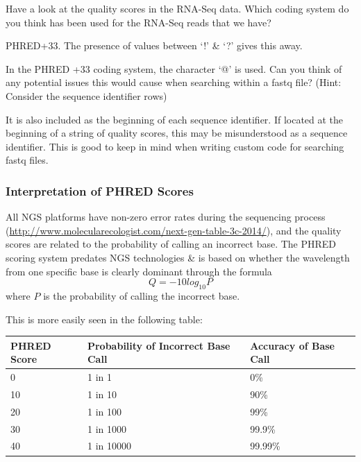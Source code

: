 \begin{questions}
Have a look at the quality scores in the RNA-Seq data.
Which coding system do you think has been used for the RNA-Seq reads that we have? \\
\begin{answer}
PHRED+33.
The presence of values between `!' \& `?' gives this away.\\
\end{answer}
In the PHRED +33 coding system, the character `@' is used.
Can you think of any potential issues this would cause when searching within a fastq file?
(Hint: Consider the sequence identifier rows)\\
\begin{answer}
It is also included as the beginning of each sequence identifier.
If located at the beginning of a string of quality scores, this may be misunderstood as a sequence identifier.
This is good to keep in mind when writing custom code for searching fastq files.
\end{answer}
\end{questions}

\subsubsection{Interpretation of PHRED Scores}

\begin{information}
All NGS platforms have non-zero error rates during the sequencing process (\url{http://www.molecularecologist.com/next-gen-table-3c-2014/}), and the quality scores are related to the probability of calling an incorrect base.
The PHRED scoring system predates NGS technologies \& is based on whether the wavelength from one specific base is clearly dominant through the formula
\begin{equation}
  \label{eq:PHRED}
  Q = -10 log_{10} P
\end{equation}
where $P$ is the probability of calling the incorrect base. \\
\end{information}

This is more easily seen in the following table: \\
\begin{center}
\begin{tabular}[h]{|p{3cm} p{5cm} p{3cm}|}
\hline
\textbf{PHRED Score} & \textbf{Probability of Incorrect Base Call} &
\textbf{Accuracy of Base Call} \\
\hline
0 & 1 in 1 & 0\% \\
10 & 1 in 10 & 90\% \\
20 & 1 in 100 & 99\% \\
30 & 1 in 1000 & 99.9\% \\
40 & 1 in 10000 & 99.99\% \\
\hline
\end{tabular}
\end{center}

